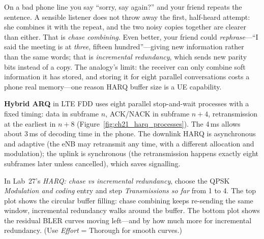 \begin{analogy}
On a bad phone line you say ``sorry, say again?'' and your friend repeats the sentence. A sensible
listener does not throw away the first, half-heard attempt: she combines it with the repeat, and the
two noisy copies together are clearer than either. That is \emph{chase combining}. Even better, your
friend could \emph{rephrase}---``I said the meeting is at \emph{three}, fifteen hundred''---giving
new information rather than the same words; that is \emph{incremental redundancy}, which sends new
parity bits instead of a copy. The analogy's limit: the receiver can only combine soft information it
has stored, and storing it for eight parallel conversations costs a phone real memory---one reason
HARQ buffer size is a UE capability.
\end{analogy}

\textbf{Hybrid ARQ} in LTE FDD uses eight parallel stop-and-wait processes with a
fixed timing: data in subframe $n$, ACK/NACK in subframe $n+4$, retransmission at the earliest in
$n+8$ (Figure~\ref{fig:ch21_harq_processes}). The 4\,ms allows about 3\,ms of decoding time in the
phone. The downlink HARQ is asynchronous and adaptive (the eNB may retransmit any time, with a
different allocation and modulation); the uplink is synchronous (the retransmission happens exactly
eight subframes later unless cancelled), which saves signalling.


\begin{tryit}
In Lab~27's \emph{HARQ: chase vs incremental redundancy}, choose the QPSK \emph{Modulation and
coding} entry and step \emph{Transmissions so far} from 1 to 4. The top plot shows the circular
buffer filling: chase combining keeps re-sending the same window, incremental redundancy walks
around the buffer. The bottom plot shows the residual BLER curves moving left---and by how much more
for incremental redundancy. (Use \emph{Effort} = Thorough for smooth curves.)
\end{tryit}

